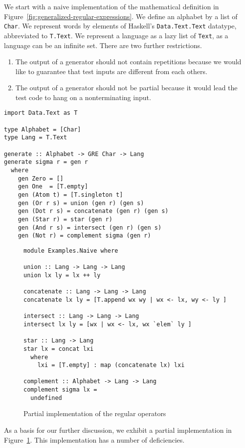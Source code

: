 We start with a naive implementation of the mathematical definition in
Figure~\ref{fig:generalized-regular-expressions}. We define an
alphabet by a list of \texttt{Char}.  We represent words by elements of Haskell's
\texttt{Data.Text.Text} datatype, abbreviated to \texttt{T.Text}. We
represent a language as a lazy list of \texttt{Text}, as a language
can be an infinite set. There are two further restrictions.
\begin{enumerate}
\item The output of a generator should not contain repetitions
  because we would like to guarantee that test inputs are different
  from each others.
\item The output of a generator should not be partial because it would
  lead the test code to hang on a nonterminating input.
\end{enumerate}
\begin{verbatim}
import Data.Text as T

type Alphabet = [Char]
type Lang = T.Text

generate :: Alphabet -> GRE Char -> Lang
generate sigma r = gen r
  where
    gen Zero = []
    gen One  = [T.empty]
    gen (Atom t) = [T.singleton t]
    gen (Or r s) = union (gen r) (gen s)
    gen (Dot r s) = concatenate (gen r) (gen s)
    gen (Star r) = star (gen r)
    gen (And r s) = intersect (gen r) (gen s)
    gen (Not r) = complement sigma (gen r)
\end{verbatim}
\begin{figure}[tp]
\begin{verbatim}
module Examples.Naive where

union :: Lang -> Lang -> Lang
union lx ly = lx ++ ly

concatenate :: Lang -> Lang -> Lang
concatenate lx ly = [T.append wx wy | wx <- lx, wy <- ly ]

intersect :: Lang -> Lang -> Lang
intersect lx ly = [wx | wx <- lx, wx `elem` ly ]

star :: Lang -> Lang
star lx = concat lxi
  where
    lxi = [T.empty] : map (concatenate lx) lxi

complement :: Alphabet -> Lang -> Lang
complement sigma lx =
  undefined
\end{verbatim}
  \caption{Partial implementation of the regular operators}
  \label{fig:regular-operators-0}
\end{figure}
As a basis for our further discussion, we exhibit a partial 
implementation in Figure~\ref{fig:regular-operators-0}.
This implementation has a number of deficiencies.
